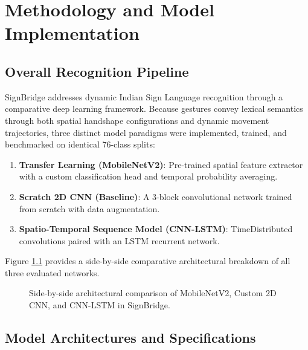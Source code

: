 \chapter{Methodology and Model Implementation}
\label{ch:methodology}

\section{Overall Recognition Pipeline}
\label{sec:overall_pipeline}
SignBridge addresses dynamic Indian Sign Language recognition through a comparative deep learning framework. Because gestures convey lexical semantics through both spatial handshape configurations and dynamic movement trajectories, three distinct model paradigms were implemented, trained, and benchmarked on identical 76-class splits:
\begin{enumerate}
    \item \textbf{Transfer Learning (MobileNetV2)}: Pre-trained spatial feature extractor with a custom classification head and temporal probability averaging.
    \item \textbf{Scratch 2D CNN (Baseline)}: A 3-block convolutional network trained from scratch with data augmentation.
    \item \textbf{Spatio-Temporal Sequence Model (CNN-LSTM)}: TimeDistributed convolutions paired with an LSTM recurrent network.
\end{enumerate}

Figure \ref{fig:models_tri} provides a side-by-side comparative architectural breakdown of all three evaluated networks.

\begin{figure}[htbp]
\centering

\caption{Side-by-side architectural comparison of MobileNetV2, Custom 2D CNN, and CNN-LSTM in SignBridge.}
\label{fig:models_tri}
\end{figure}

\section{Model Architectures and Specifications}
\label{sec:arch_specs}

